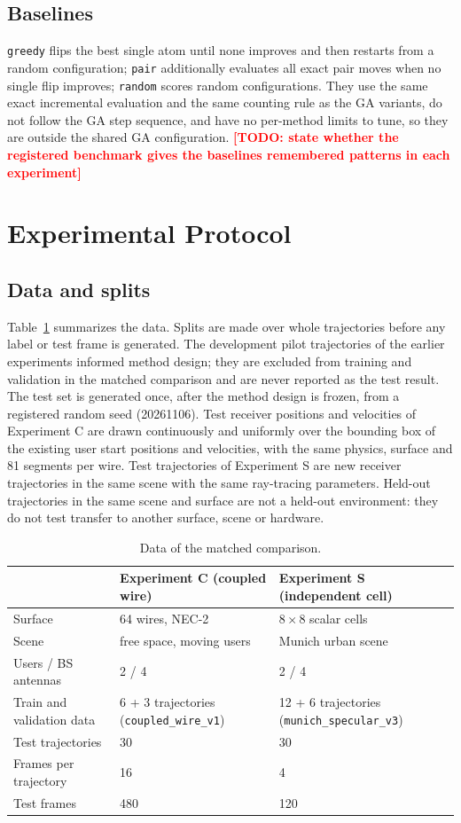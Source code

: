 \documentclass[conference]{IEEEtran}
\newcommand{\mth}[1]{\begingroup\renewcommand{\_}{\textunderscore\allowbreak}\texttt{#1}\endgroup}
\newcommand{\TODO}[1]{\textbf{\textcolor{red}{[TODO: #1]}}}
\begin{document}
\subsection{Baselines}
\mth{greedy} flips the best single atom until none improves and then restarts from a random configuration; \mth{pair} additionally evaluates all exact pair moves when no single flip improves; \mth{random} scores random configurations. They use the same exact incremental evaluation and the same counting rule as the GA variants, do not follow the GA step sequence, and have no per-method limits to tune, so they are outside the shared GA configuration. \TODO{state whether the registered benchmark gives the baselines remembered patterns in each experiment}

\section{Experimental Protocol}\label{sec:protocol}
\subsection{Data and splits}
Table~\ref{tab:data} summarizes the data. Splits are made over whole trajectories before any label or test frame is generated. The development pilot trajectories of the earlier experiments informed method design; they are excluded from training and validation in the matched comparison and are never reported as the test result. The test set is generated once, after the method design is frozen, from a registered random seed (20261106). Test receiver positions and velocities of Experiment C are drawn continuously and uniformly over the bounding box of the existing user start positions and velocities, with the same physics, surface and 81 segments per wire. Test trajectories of Experiment S are new receiver trajectories in the same scene with the same ray-tracing parameters. Held-out trajectories in the same scene and surface are not a held-out environment: they do not test transfer to another surface, scene or hardware.

\begin{table}[t]
\caption{Data of the matched comparison.}\label{tab:data}
\centering\scriptsize
\begin{tabular}{@{}p{}p{}p{}@{}}
\toprule
 & Experiment C (coupled wire) & Experiment S (independent cell)\\
\midrule
Surface & 64 wires, NEC-2 & $8\times8$ scalar cells\\
Scene & free space, moving users & Munich urban scene\\
Users / BS antennas & 2 / 4 & 2 / 4\\
Train and validation data & 6 + 3 trajectories (\texttt{coupled\_wire\_v1}) & 12 + 6 trajectories (\texttt{munich\_specular\_v3})\\
Test trajectories & 30 & 30\\
Frames per trajectory & 16 & 4\\
Test frames & 480 & 120\\
\bottomrule
\end{tabular}
\end{table}
\end{document}
